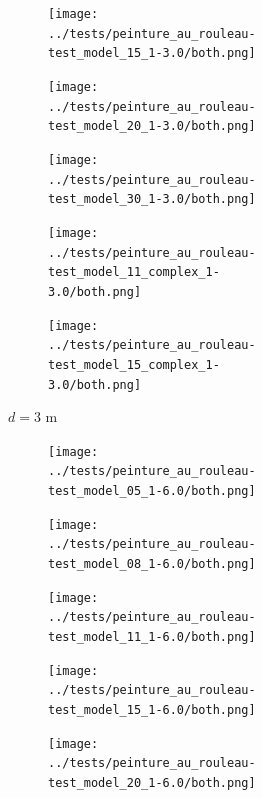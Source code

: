 \documentclass[francais,RandD]{rapportPFE}
\begin{document}
\begin{figure}[H]
\begin{subfigure}[t]{\linewidth}
				\hfill
				\begin{subfigure}[t]{0.11\linewidth}
					\texttt{[image: ../tests/peinture\_au\_rouleau-test\_model\_15\_1-3.0/both.png]}
				\end{subfigure}
				\hfill
				\begin{subfigure}[t]{0.11\linewidth}
					\texttt{[image: ../tests/peinture\_au\_rouleau-test\_model\_20\_1-3.0/both.png]}
				\end{subfigure}
				\hfill
				\begin{subfigure}[t]{0.11\linewidth}
					\texttt{[image: ../tests/peinture\_au\_rouleau-test\_model\_30\_1-3.0/both.png]}
				\end{subfigure}
				\hfill
				\begin{subfigure}[t]{0.11\linewidth}
					\texttt{[image: ../tests/peinture\_au\_rouleau-test\_model\_11\_complex\_1-3.0/both.png]}
				\end{subfigure}
				\hfill
				\begin{subfigure}[t]{0.11\linewidth}
					\texttt{[image: ../tests/peinture\_au\_rouleau-test\_model\_15\_complex\_1-3.0/both.png]}
				\end{subfigure}
				\caption{$d = 3$ m}
			\end{subfigure}
			\hfill
			\begin{subfigure}[t]{\linewidth}
				\centering
				\begin{subfigure}[t]{0.11\linewidth}
					\texttt{[image: ../tests/peinture\_au\_rouleau-test\_model\_05\_1-6.0/both.png]}
				\end{subfigure}
				\hfill
				\begin{subfigure}[t]{0.11\linewidth}
					\texttt{[image: ../tests/peinture\_au\_rouleau-test\_model\_08\_1-6.0/both.png]}
				\end{subfigure}
				\hfill
				\begin{subfigure}[t]{0.11\linewidth}
					\texttt{[image: ../tests/peinture\_au\_rouleau-test\_model\_11\_1-6.0/both.png]}
				\end{subfigure}
				\hfill
				\begin{subfigure}[t]{0.11\linewidth}
					\texttt{[image: ../tests/peinture\_au\_rouleau-test\_model\_15\_1-6.0/both.png]}
				\end{subfigure}
				\hfill
				\begin{subfigure}[t]{0.11\linewidth}
					\texttt{[image: ../tests/peinture\_au\_rouleau-test\_model\_20\_1-6.0/both.png]}
				\end{subfigure}
				\hfill
				\begin{subfigure}[t]{0.11\linewidth}

\end{subfigure}
\end{subfigure}
\end{figure}
\end{document}

